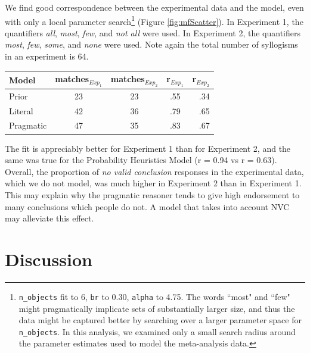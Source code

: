 \documentclass[10pt,letterpaper]{article}
\begin{document}
We find good correspondence between the experimental data and the model, even with only a local parameter search\footnote{ \lstinline{n_objects} fit to 6, \lstinline{br} to 0.30, \lstinline{alpha} to 4.75. The words ``most" and ``few" might pragmatically implicate sets of substantially larger size, and thus the data might be captured better by searching over a larger parameter space for  \lstinline{n_objects}.  In this analysis, we examined only a small search radius around the parameter estimates used to model the meta-analysis data.} (Figure \ref{fig:mfScatter}). In Experiment 1, the quantifiers \emph{all}, \emph{most}, \emph{few}, and \emph{not all} were used. In Experiment 2, the quantifiers \emph{most}, \emph{few}, \emph{some}, and \emph{none} were used. Note again the total number of syllogisms in an experiment is 64.
\begin{tabular}{l*{3}{c}r}
Model              & matches$_{Exp_{1}}$ & matches$_{Exp_{2}}$ & r$_{Exp_{1}}$ & r$_{Exp_{2}}$  \\
\hline
Prior & 23 & 23 & .55 & .34  \\
Literal & 42 & 36 & .79 & .65   \\
Pragmatic & 47 & 35 & .83 & .67  \\
\end{tabular}

%

%
The fit is appreciably better for Experiment 1 than for Experiment 2, and the same was true for the Probability Heuristics Model (r = 0.94 vs r = 0.63). Overall, the proportion of \emph{no valid conclusion} responses in the experimental data, which we do not model, was much higher in Experiment 2 than in Experiment 1. This may explain why the pragmatic reasoner tends to give high endorsement to many conclusions which people do not. A model that takes into account NVC may alleviate this effect.


\section{Discussion}
\end{document}
